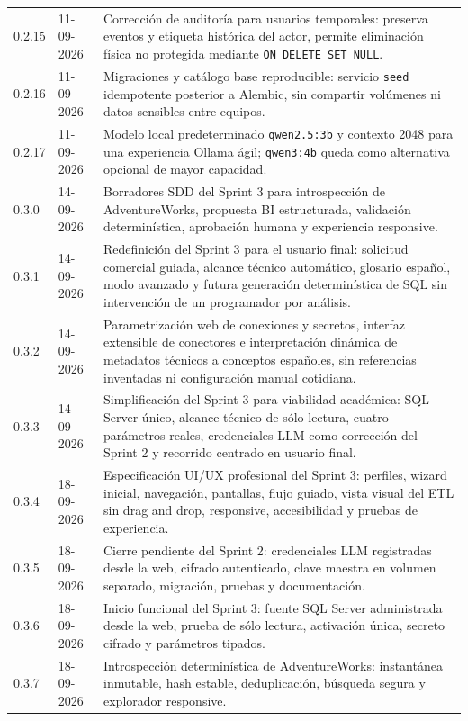 \documentclass[11pt,letterpaper]{article}
\newcommand{\file}[1]{\texttt{#1}}
\begin{document}
\begin{longtable}{@{}p{0.82in}@{\hspace{0.16in}}p{0.98in}@{\hspace{0.16in}}p{4.36in}@{}}
  0.2.15 & 11-09-2026 & Corrección de auditoría para usuarios temporales: preserva eventos y etiqueta histórica del actor, permite eliminación física no protegida mediante \file{ON DELETE SET NULL}. \\
  0.2.16 & 11-09-2026 & Migraciones y catálogo base reproducible: servicio \file{seed} idempotente posterior a Alembic, sin compartir volúmenes ni datos sensibles entre equipos. \\
  0.2.17 & 11-09-2026 & Modelo local predeterminado \file{qwen2.5:3b} y contexto 2048 para una experiencia Ollama ágil; \file{qwen3:4b} queda como alternativa opcional de mayor capacidad. \\
  0.3.0 & 14-09-2026 & Borradores SDD del Sprint 3 para introspección de AdventureWorks, propuesta BI estructurada, validación determinística, aprobación humana y experiencia responsive. \\
  0.3.1 & 14-09-2026 & Redefinición del Sprint 3 para el usuario final: solicitud comercial guiada, alcance técnico automático, glosario español, modo avanzado y futura generación determinística de SQL sin intervención de un programador por análisis. \\
  0.3.2 & 14-09-2026 & Parametrización web de conexiones y secretos, interfaz extensible de conectores e interpretación dinámica de metadatos técnicos a conceptos españoles, sin referencias inventadas ni configuración manual cotidiana. \\
  0.3.3 & 14-09-2026 & Simplificación del Sprint 3 para viabilidad académica: SQL Server único, alcance técnico de sólo lectura, cuatro parámetros reales, credenciales LLM como corrección del Sprint 2 y recorrido centrado en usuario final. \\
  0.3.4 & 18-09-2026 & Especificación UI/UX profesional del Sprint 3: perfiles, wizard inicial, navegación, pantallas, flujo guiado, vista visual del ETL sin drag and drop, responsive, accesibilidad y pruebas de experiencia. \\
  0.3.5 & 18-09-2026 & Cierre pendiente del Sprint 2: credenciales LLM registradas desde la web, cifrado autenticado, clave maestra en volumen separado, migración, pruebas y documentación. \\
  0.3.6 & 18-09-2026 & Inicio funcional del Sprint 3: fuente SQL Server administrada desde la web, prueba de sólo lectura, activación única, secreto cifrado y parámetros tipados. \\
  0.3.7 & 18-09-2026 & Introspección determinística de AdventureWorks: instantánea inmutable, hash estable, deduplicación, búsqueda segura y explorador responsive. \\

\end{longtable}
\end{document}

